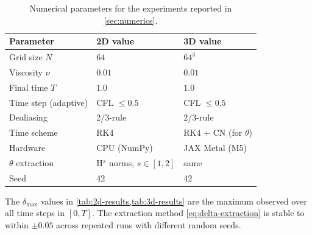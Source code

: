 \documentclass[12pt]{article}
\theoremstyle{plain}
\theoremstyle{definition}
\theoremstyle{remark}
\begin{document}
\begin{table}[h]
\centering
\caption{Numerical parameters for the experiments reported in \cref{sec:numerics}.}
\label{tab:numerics}
\begin{tabular}{lll}
\toprule
Parameter & 2D value & 3D value \\
\midrule
Grid size $N$         & $64$       & $64^3$     \\
Viscosity $\nu$       & $0.01$     & $0.01$     \\
Final time $T$        & $1.0$      & $1.0$      \\
Time step (adaptive)  & CFL $\leq 0.5$ & CFL $\leq 0.5$ \\
Dealiasing            & 2/3-rule   & 2/3-rule   \\
Time scheme           & RK4        & RK4 + CN (for $\theta$) \\
Hardware              & CPU (NumPy) & JAX Metal (M5)\\
$\theta$ extraction   & H$^s$ norms, $s\in[1,2]$ & same \\
Seed                  & 42         & 42         \\
\bottomrule
\end{tabular}
\end{table}

The $\delta_{\max}$ values in \cref{tab:2d-results,tab:3d-results} are the
maximum observed over all time steps in $[0,T]$.
The extraction method \eqref{eq:delta-extraction} is stable to within
$\pm 0.05$ across repeated runs with different random seeds.
\end{document}

